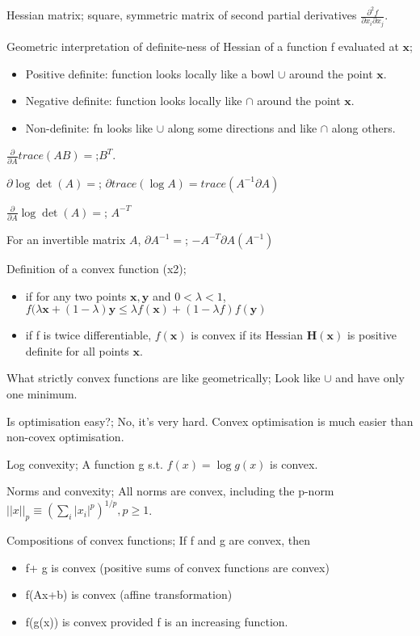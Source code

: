 \documentclass{article}
\begin{document}
Hessian matrix; square, symmetric matrix of second partial derivatives $\frac{\partial^2 f}{\partial x_i \partial x_j}$.

Geometric interpretation of definite-ness of Hessian of a function f evaluated at $\mathbf{x}$; \begin{itemize} \item Positive definite: function looks locally like a bowl $\cup$ around the point $\mathbf{x}$. \item Negative definite: function looks locally like $\cap$ around the point $\mathbf{x}$. \item Non-definite: fn looks like $\cup$ along some directions and like $\cap$ along others. \end{itemize} 

$\frac{\partial}{\partial A}trace(AB) =$;$B^T$.

$\partial \log \det (A) =$; $\partial trace(\log A) = trace(A^{-1}\partial A)$

$\frac{\partial}{\partial A}\log\det(A)=$; $A^{-T}$

For an invertible matrix $A$, $\partial A^{-1}=$; $-A^{-T}\partial A (A^{-1})$

Definition of a convex function (x2); \begin{itemize} \item if for any two points $\mathbf{x, y}$ and $0<\lambda < 1$, $f(\lambda\mathbf{x}+(1-\lambda)\mathbf{y}\leq \lambda f(\mathbf{x})+(1-\lambda f)f(\mathbf{y})$ \item if f is twice  differentiable, $f(\mathbf{x})$ is convex if its Hessian $\mathbf{H(x)}$ is positive definite for all points $\mathbf{x}$. \end{itemize}

What strictly convex functions are like geometrically; Look like $\cup$ and have only one minimum.

Is optimisation easy?; No, it's very hard. Convex optimisation is much easier than non-covex optimisation.

Log convexity; A function g s.t. $f(x)=\log g(x)$ is convex.

Norms and convexity; All norms are convex, including the p-norm $||x||_p \equiv (\sum_i |x_i|^p)^{1/p}, p\geq 1$.

Compositions of convex functions; If f and g are convex, then \begin{itemize} \item f+ g is convex (positive sums of convex functions are convex) \item f(Ax+b) is convex (affine transformation) \item f(g(x)) is convex provided f is an increasing function. \end{itemize}
\end{document}
